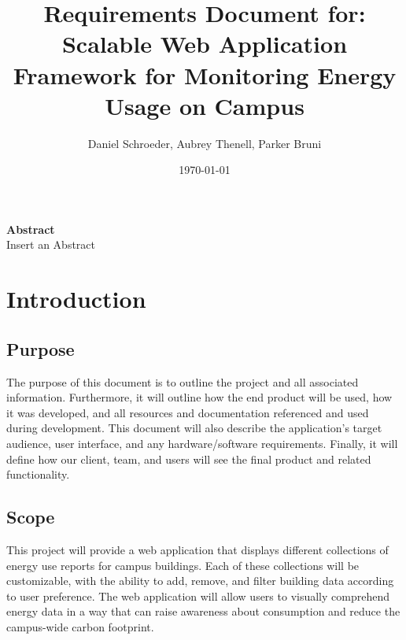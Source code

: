 \documentclass[onecolumn, draftclsnofoot,10pt, compsoc]{IEEEtran}
\title{Requirements Document for: \linebreak Scalable Web Application Framework for Monitoring Energy Usage on Campus}
\author{Daniel Schroeder, Aubrey Thenell, Parker Bruni}
\date{\today}
\begin{document}
    \maketitle
    \noindent \textbf{Abstract} \\
                \indent 
                Insert an Abstract
    
    
    \newpage
    \tableofcontents
    \clearpage
    
    \section{Introduction}
    \subsection{Purpose}
	The purpose of this document is to outline the project and all associated information. Furthermore, it will outline how the end product will be used, how it was developed, and all resources and documentation referenced and used during development. This document will also describe the application’s target audience, user interface, and any hardware/software requirements. Finally, it will define how our client, team, and users will see the final product and related functionality.
    \subsection{Scope}
    This project will provide a web application that displays different collections of energy use reports for campus buildings. Each of these collections will be customizable, with the ability to add, remove, and filter building data according to user preference. The web application will allow users to visually comprehend energy data in a way that can raise awareness about consumption and reduce the campus-wide carbon footprint.
    
\end{document}
